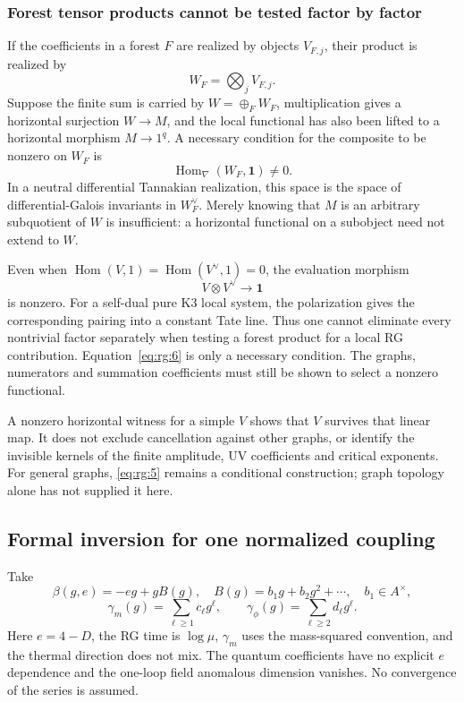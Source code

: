 \documentclass[11pt,a4paper,oneside]{article}
\theoremstyle{plain}
\theoremstyle{definition}
\theoremstyle{remark}
\numberwithin{equation}{section}
\begin{document}
\subsubsection{Forest tensor products cannot be tested factor by factor}\label{sec:rg:3.2}
If the coefficients in a forest $F$ are realized by objects $V_{F,j}$, their product is realized by
\begin{equation}
W_F=\bigotimes_j V_{F,j}.
\end{equation}
Suppose the finite sum is carried by $W=\oplus_F W_F$, multiplication gives a horizontal surjection $W\to M$, and the local functional has also been lifted to a horizontal morphism $M\to1^q$. A necessary condition for the composite to be nonzero on $W_F$ is
\begin{equation}
\operatorname{Hom}_{\nabla}(W_F,\mathbf1)\ne0.     \label{eq:rg:6}
\end{equation}
In a neutral differential Tannakian realization, this space is the space of differential-Galois invariants in $W_F^\vee$. Merely knowing that $M$ is an arbitrary subquotient of $W$ is insufficient: a horizontal functional on a subobject need not extend to $W$.

Even when $\operatorname{Hom}(V,1)=\operatorname{Hom}(V^\vee,1)=0$, the evaluation morphism
\begin{equation}
V\otimes V^\vee\longrightarrow\mathbf1
\end{equation}
is nonzero. For a self-dual pure K3 local system, the polarization gives the corresponding pairing into a constant Tate line. Thus one cannot eliminate every nontrivial factor separately when testing a forest product for a local RG contribution. Equation~\eqref{eq:rg:6} is only a necessary condition. The graphs, numerators and summation coefficients must still be shown to select a nonzero functional.

A nonzero horizontal witness for a simple $V$ shows that $V$ survives that linear map. It does not exclude cancellation against other graphs, or identify the invisible kernels of the finite amplitude, UV coefficients and critical exponents. For general graphs, \eqref{eq:rg:5} remains a conditional construction; graph topology alone has not supplied it here.

\subsection{Formal inversion for one normalized coupling}\label{sec:rg:4}
Take
\begin{equation}
\beta(g,e)=-eg+gB(g),\quad
 B(g)=b_1g+b_2g^2+\cdots,\quad b_1\in A^\times,
\end{equation}
\begin{equation}
\gamma_m(g)=\sum_{\ell\ge1}c_\ell g^\ell,\qquad
 \gamma_\phi(g)=\sum_{\ell\ge2}d_\ell g^\ell.         \label{eq:rg:7}
\end{equation}
Here $e=4-D$, the RG time is $\log\mu$, $\gamma_m$ uses the mass-squared convention, and the thermal direction does not mix. The quantum coefficients have no explicit $e$ dependence and the one-loop field anomalous dimension vanishes. No convergence of the series is assumed.
\end{document}
